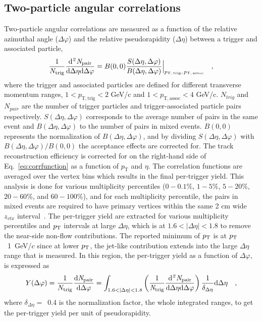 \subsection{Two-particle angular correlations}
Two-particle angular correlations are measured as a function of the relative azimuthal angle ($\Delta\varphi$) and the relative pseudorapidity ($\Delta\eta$) between a trigger and associated particle,
\begin{eqnarray}
\frac{1}{N_{\rm{trig}}} \frac{ \rm{d}\it{}^{2} N_{\rm{pair}} }{ \rm{d} \Delta\eta \rm{d}\Delta\varphi} = B(0, 0)\frac{S(\Delta\eta, \Delta\varphi)}{B(\Delta\eta, \Delta\varphi)}  \Big\lvert_{p_\mathrm{T,\,trig},\,p_\mathrm{T,\,assoc}}\quad , 
\label{eq:corrfunction}
\end{eqnarray}
where the trigger and associated particles are defined for different transverse momentum ranges, $1<p_\mathrm{T,trig}<2$ GeV/c and $1<p_\mathrm{T,assoc}<4$ GeV/c. $N_{trig}$ and $N_{pair}$ are the number of trigger particles and trigger-associated particle pairs respectively. $S(\Delta\eta, \Delta\varphi)$ corresponds to the average number of pairs in the same event and $B(\Delta\eta, \Delta\varphi)$ to the number of pairs in mixed events. $B (0,0)$ represents the normalization of $B(\Delta\eta, \Delta\varphi)$, and by dividing $S(\Delta\eta, \Delta\varphi)$ with $B(\Delta\eta, \Delta\varphi)/B (0,0)$ the acceptance effects are corrected for. The track reconstruction efficiency is corrected for on the right-hand side of Eq.~\ref{eq:corrfunction} as a function of $p_\mathrm{T}$ and $\eta$. The correlation functions are averaged over the vertex bins which results in the final per-trigger yield. This analysis is done for various multiplicity percentiles ($0-0.1\%$, $1-5\%$, $5-20\%$, $20-60\%$, and $60-100\%$), and for each multiplicity percentile, the pairs in mixed events are required to have primary vertices within the same 2 cm wide $z_{vtx}$ interval~\cite{KOPYLOV1974472:evtmixing,Adam:2016tsv}. 
The per-trigger yield are extracted for various multiplicity percentiles and $p_\mathrm{T}$ intervals at large $\Delta\eta$, which is at $1.6<|\Delta\eta|<1.8$ to remove the near-side non-flow contributions. The reported minimum of $p_\mathrm{T}$  is at $p_\mathrm{T}$~1~GeV/$c$ since at lower $p_\mathrm{T}$, the jet-like contribution extends into the large $\Delta\eta$ range that is measured. In this region, the per-trigger yield as a function of $\Delta\varphi$, is expressed as
\begin{eqnarray}
Y(\Delta\varphi) = \frac{1}{N_{\rm{trig}}} \frac{ \rm{d}\it{}N_{\rm{pair}} }{ \rm{d}\Delta\varphi } = \int_{1.6<|\Delta \eta|<1.8} \left( \frac{1}{\it{N}_{\rm{trig}}} \frac{ \rm{d}\it{}^{2} N_{\rm{pair}} }{ \rm{d}\Delta\eta d\Delta\varphi} \right) \dfrac{1}{\delta_{\Delta\eta}} \rm{d}\Delta \eta \quad ,
\label{eq:pertrigger}
\end{eqnarray}
where $\delta_{\Delta\eta}=$~0.4 is the normalization factor, the whole integrated ranges, to get the per-trigger yield per unit of pseudorapidity. 


